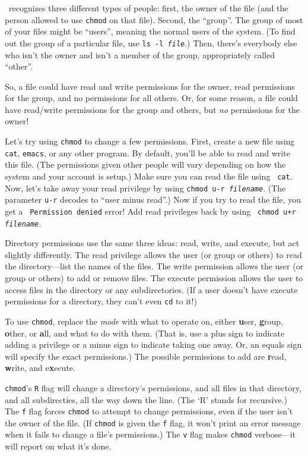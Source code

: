 \unix\ recognizes three different types of people: first, the owner of
the file (and the person allowed to use {\tt chmod} on that file).
Second, the ``group''.  The group of most of your files might be
``users'', meaning the normal users of the system. (To find out the
group of a particular file, use {\tt ls -l {\sl file}}.) Then, there's
everybody else who isn't the owner and isn't a member of the group,
appropriately called ``other''.

So, a file could have read and write permissions for the owner, read
permissions for the group, and no permissions for all others.  Or, for
some reason, a file could have read/write permissions for the group
and others, but {\em no\/} permissions for the owner!

Let's try using {\tt chmod} to change a few permissions. First, create
a new file using {\tt cat}, {\tt emacs}, or any other program. By
default, you'll be able to read and write this file. (The permissions
given other people will vary depending on how the system and your
account is setup.) Make sure you can read the file using {\tt
  cat}. Now, let's take away your read privilege by using {\tt chmod
  u-r {\sl filename}}. (The parameter {\tt u-r} decodes to ``user
minus read''.) Now if you try to read the file, you get a {\tt
  Permission denied} error! Add read privileges back by using {\tt
  chmod u+r {\sl filename}}.

Directory permissions use the same three
ideas: read, write, and execute, but act slightly differently. The
read privilege allows the user (or group or others) to read the
directory---list the names of the files.  The write permission allows
the user (or group or others) to add or remove files. The execute
permission allows the user to access files in the directory or any
subdirectories. (If a user doesn't have execute permissions for a
directory, they can't even {\tt cd} to it!)

To use {\tt chmod}, replace the {\sl mode} with what to operate on,
either {\bf u}ser, {\bf g}roup, {\bf o}ther, or {\bf a}ll, and what to
do with them. (That is, use a plus sign to indicate adding a privilege
or a minus sign to indicate taking one away. Or, an equals sign will
specify the exact permissions.) The possible permissions to add are
{\bf r}ead, {\bf w}rite, and e{\bf x}ecute.

{\tt chmod}'s {\tt R} flag will change a directory's permissions, and
all files in that directory, and all subdirecties, all the way down
the line. (The `R' stands for recursive.)  The {\tt f} flag forces
{\tt chmod} to attempt to change permissions, even if the user isn't
the owner of the file. (If {\tt chmod} is given the {\tt f} flag, it
won't print an error message when it fails to change a file's
permissions.)  The {\tt v} flag makes {\tt chmod} verbose---it will
report on what it's done.

